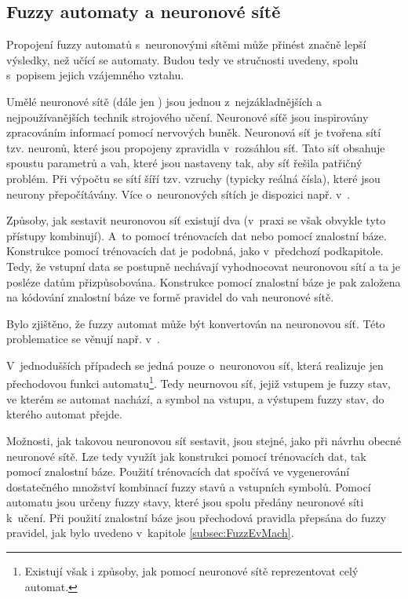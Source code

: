 \subsection{Fuzzy automaty a neuronové sítě}
Propojení fuzzy automatů s~neuronovými sítěmi může přinést značně lepší výsledky, než učící se automaty. Budou tedy ve stručnosti uvedeny, spolu s~popisem jejich vzájemného vztahu.

Umělé neuronové sítě (dále jen ) jsou jednou z~nejzákladnějších a nejpoužívanějších technik strojového učení. Neuronové síťě jsou inspirovány zpracováním informací pomocí nervových buněk. Neuronová síť je tvořena sítí tzv. neuronů, které jsou propojeny zpravidla v~rozsáhlou síť. Tato síť obsahuje spoustu parametrů a vah, které jsou nastaveny tak, aby síť řešila patřičný problém. Při výpočtu se sítí šíří tzv. vzruchy (typicky reálná čísla), které jsou neurony přepočítávány. Více o~neuronových sítích je dispozici např. v~\cite{FieRus-HanNeuCom}.

Způsoby, jak sestavit neuronovou síť existují dva (v~praxi se však obvykle tyto přístupy kombinují). A~to pomocí trénovacích dat nebo pomocí znalostní báze. Konstrukce pomocí trénovacích dat je podobná, jako v~předchozí podkapitole. Tedy, že vstupní data se postupně nechávají vyhodnocovat neuronovou sítí a ta je posléze datům přizpůsobována. Konstrukce pomocí znalostní báze je pak založena na kódování znalostní báze ve formě \ifthen pravidel do vah neuronové sítě.

Bylo zjištěno, že fuzzy automat může být konvertován na neuronovou síť. Této problematice se věnují např. v~\cite{DarAhmSin-AppFuzzAutTheKnBsNeuNetDevBasLeaMod, OmlThoGil-FuzzFinStaAutCanDetEncIntRecNeuNet, BlaDelPeg-FuzzAutIndUsNeuNet, GilOmlTho-EquKnoRep+, OmlThoGil-RepFuzFinStaAuConRecNeuNet, UnaKha-FuzDFinStaMachImpBasNeuFuzSys, PedGac-LeaFuzzAut}.

V~jednodušších případech se jedná pouze o~neuronovou síť, která realizuje jen přechodovou funkci automatu\footnote{Existují však i způsoby, jak pomocí neuronové sítě reprezentovat celý automat.}. Tedy neurnovou síť, jejiž vstupem je fuzzy stav, ve kterém se automat nachází, a symbol na vstupu, a výstupem fuzzy stav, do kterého automat přejde.

Možnosti, jak takovou neuronovou síť sestavit, jsou stejné, jako při návrhu obecné neuronové sítě. Lze tedy využít jak konstrukci pomocí trénovacích dat, tak pomocí znalostní báze. Použití trénovacích dat spočívá ve vygenerování dostatečného množství kombinací fuzzy stavů a vstupních symbolů. Pomocí automatu jsou určeny  fuzzy stavy, které jsou spolu předány neuronové síti k~učení. Při použití znalostní báze jsou přechodová pravidla přepsána do fuzzy \ifthen pravidel, jak bylo uvedeno v~kapitole \ref{subsec:FuzzEvMach}.


